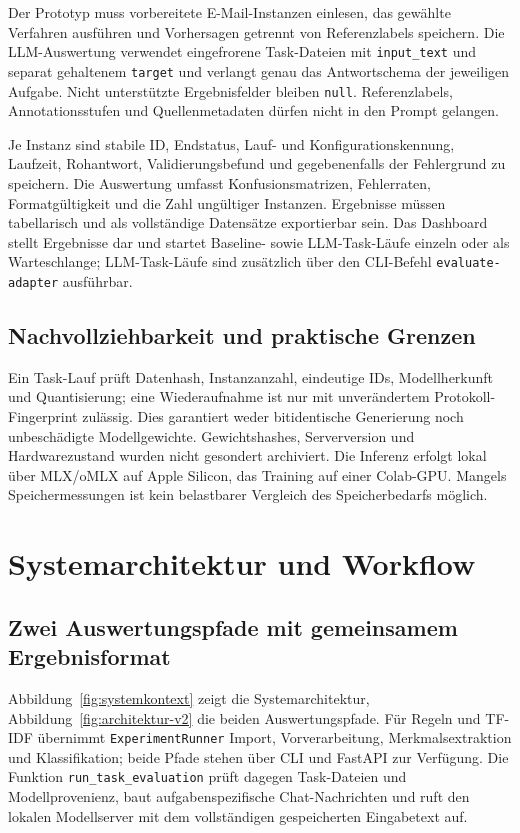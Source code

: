 \documentclass[12pt,twoside=false,a4paper,parskip]{scrbook}
\begin{document}
Der Prototyp muss vorbereitete E-Mail-Instanzen einlesen, das gewählte Verfahren ausführen und Vorhersagen getrennt von Referenzlabels speichern. Die LLM-Auswertung verwendet eingefrorene Task-Dateien mit \texttt{input\_text} und separat gehaltenem \texttt{target} und verlangt genau das Antwortschema der jeweiligen Aufgabe. Nicht unterstützte Ergebnisfelder bleiben \texttt{null}. Referenzlabels, Annotationsstufen und Quellenmetadaten dürfen nicht in den Prompt gelangen.

Je Instanz sind stabile ID, Endstatus, Lauf- und Konfigurationskennung, Laufzeit, Rohantwort, Validierungsbefund und gegebenenfalls der Fehlergrund zu speichern. Die Auswertung umfasst Konfusionsmatrizen, Fehlerraten, Formatgültigkeit und die Zahl ungültiger Instanzen. Ergebnisse müssen tabellarisch und als vollständige Datensätze exportierbar sein. Das Dashboard stellt Ergebnisse dar und startet Baseline- sowie LLM-Task-Läufe einzeln oder als Warteschlange; LLM-Task-Läufe sind zusätzlich über den CLI-Befehl \texttt{evaluate-adapter} ausführbar.

\subsection{Nachvollziehbarkeit und praktische Grenzen}

Ein Task-Lauf prüft Datenhash, Instanzanzahl, eindeutige IDs, Modellherkunft und Quantisierung; eine Wiederaufnahme ist nur mit unverändertem Protokoll-Fingerprint zulässig. Dies garantiert weder bitidentische Generierung noch unbeschädigte Modellgewichte. Gewichtshashes, Serverversion und Hardwarezustand wurden nicht gesondert archiviert. Die Inferenz erfolgt lokal über MLX/oMLX auf Apple Silicon, das Training auf einer Colab-GPU. Mangels Speichermessungen ist kein belastbarer Vergleich des Speicherbedarfs möglich.

\section{Systemarchitektur und Workflow}\label{sec:architektur}

\subsection{Zwei Auswertungspfade mit gemeinsamem Ergebnisformat}

Abbildung~\ref{fig:systemkontext} zeigt die Systemarchitektur, Abbildung~\ref{fig:architektur-v2} die beiden Auswertungspfade. Für Regeln und TF-IDF übernimmt \texttt{ExperimentRunner} Import, Vorverarbeitung, Merkmalsextraktion und Klassifikation; beide Pfade stehen über CLI und FastAPI zur Verfügung. Die Funktion \texttt{run\_task\_evaluation} prüft dagegen Task-Dateien und Modellprovenienz, baut aufgabenspezifische Chat-Nachrichten und ruft den lokalen Modellserver mit dem vollständigen gespeicherten Eingabetext auf.
\end{document}
